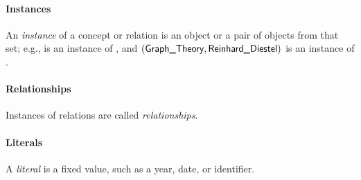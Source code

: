 \paragraph{Instances}
An \emph{instance} of a concept or relation
is an object or a pair of objects from that set;
e.g.,  is an instance of ,
and $(\textsf{Graph\_Theory},\textsf{Reinhard\_Diestel})$ is an instance of
.

\paragraph{Relationships}
Instances of relations are called \emph{relationships}.

\paragraph{Literals}
A \emph{literal} is a fixed value, such as a year, date, or identifier.

%    
%    
%    
%

